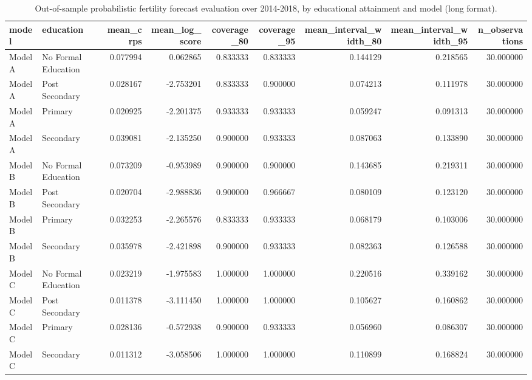 \begin{table}[ht]
\centering
\begin{tabular}{llrrrrrrr}
\hline
model & education & mean_crps & mean_log_score & coverage_80 & coverage_95 & mean_interval_width_80 & mean_interval_width_95 & n_observations \\
\hline
Model A & No Formal Education & 0.077994 & 0.062865 & 0.833333 & 0.833333 & 0.144129 & 0.218565 & 30.000000 \\
Model A & Post Secondary & 0.028167 & -2.753201 & 0.833333 & 0.900000 & 0.074213 & 0.111978 & 30.000000 \\
Model A & Primary & 0.020925 & -2.201375 & 0.933333 & 0.933333 & 0.059247 & 0.091313 & 30.000000 \\
Model A & Secondary & 0.039081 & -2.135250 & 0.900000 & 0.933333 & 0.087063 & 0.133890 & 30.000000 \\
Model B & No Formal Education & 0.073209 & -0.953989 & 0.900000 & 0.900000 & 0.143685 & 0.219311 & 30.000000 \\
Model B & Post Secondary & 0.020704 & -2.988836 & 0.900000 & 0.966667 & 0.080109 & 0.123120 & 30.000000 \\
Model B & Primary & 0.032253 & -2.265576 & 0.833333 & 0.933333 & 0.068179 & 0.103006 & 30.000000 \\
Model B & Secondary & 0.035978 & -2.421898 & 0.900000 & 0.933333 & 0.082363 & 0.126588 & 30.000000 \\
Model C & No Formal Education & 0.023219 & -1.975583 & 1.000000 & 1.000000 & 0.220516 & 0.339162 & 30.000000 \\
Model C & Post Secondary & 0.011378 & -3.111450 & 1.000000 & 1.000000 & 0.105627 & 0.160862 & 30.000000 \\
Model C & Primary & 0.028136 & -0.572938 & 0.900000 & 0.933333 & 0.056960 & 0.086307 & 30.000000 \\
Model C & Secondary & 0.011312 & -3.058506 & 1.000000 & 1.000000 & 0.110899 & 0.168824 & 30.000000 \\
\hline
\end{tabular}
\caption{Out-of-sample probabilistic fertility forecast evaluation over 2014-2018, by educational attainment and model (long format).}
\label{tab:new_table_e8_long}
\end{table}
